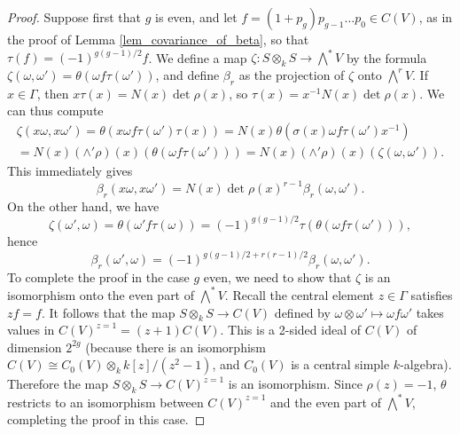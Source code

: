 \documentclass{article} %
\numberwithin{equation}{section}
\begin{document}
\begin{proof}
    Suppose first that $g$ is even, and let $f = (1+p_g) p_{g-1} \dots p_0 \in C(V)$, as in the proof of Lemma \ref{lem_covariance_of_beta}, so that $\tau(f) = (-1)^{g(g-1)/2} f$. We define a map $\zeta : S \otimes_k S \to \bigwedge^\ast V$ by the formula $\zeta(\omega, \omega') = \theta( \omega f \tau(\omega'))$, and define $\beta_r$ as the projection of $\zeta$ onto $\bigwedge^rV$.
    If $x \in \Gamma$, then $x \tau(x) = N(x) \det \rho(x)$, so $\tau(x) = x^{-1} N(x) \det \rho(x)$. We can thus compute
    \begin{multline*} \zeta(x \omega, x \omega') = \theta( x \omega f  \tau(\omega') \tau(x)) = N(x) \theta (\sigma(x) \omega f \tau(\omega') x^{-1}) \\ = N(x) (\wedge' \rho)(x)(\theta( \omega f \tau(\omega'))) = N(x) (\wedge' \rho)(x) (\zeta(\omega, \omega')). 
    \end{multline*}
    This immediately gives
    \[ \beta_r(x \omega, x \omega') = N(x) \det \rho(x)^{r-1} \beta_r(\omega, \omega'). \]
    On the other hand, we have
    \[ \zeta(\omega', \omega) = \theta( \omega' f \tau(\omega)) = (-1)^{g(g-1)/2} \tau( \theta(\omega f \tau(\omega'))), \]
    hence
    \[ \beta_r(\omega', \omega) = (-1)^{g(g-1)/2 + r (r-1)/2} \beta_r(\omega, \omega'). \]
    To complete the proof in the case $g$ even, we need to show that $\zeta$ is an isomorphism onto the even part of $\bigwedge^\ast V$. Recall the central element $z \in \Gamma$ satisfies $z f = f$. It follows that the map $S \otimes_k S \to C(V)$ defined by $\omega \otimes \omega' \mapsto \omega f \omega'$ takes values in $C(V)^{z = 1} = (z+1) C(V)$. This is a 2-sided ideal of $C(V)$ of dimension $2^{2g}$ (because there is an isomorphism $C(V) \cong C_0(V) \otimes_k k[z] / (z^2-1)$, and $C_0(V)$ is a central simple $k$-algebra). Therefore the map $S \otimes_k S \to C(V)^{z=1}$ is an isomorphism. Since $\rho(z) = -1$, $\theta$ restricts to an isomorphism between $C(V)^{z=1}$ and the even part of $\bigwedge^\ast V$, completing the proof in this case.
    

\end{proof}
\end{document}
